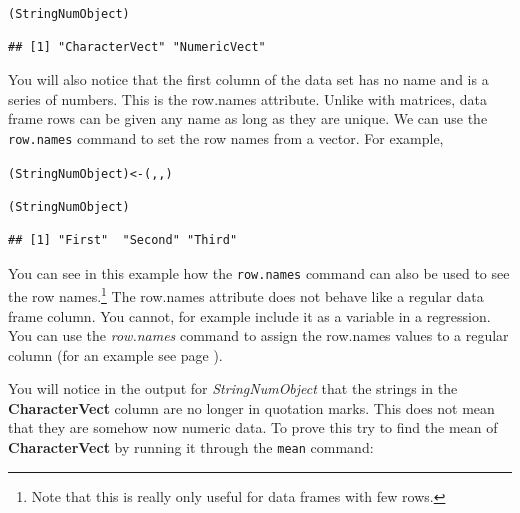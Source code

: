 \documentclass[krantz1]{krantz}
\begin{document}
\begin{knitrout}
\color{fgcolor}\begin{kframe}
\begin{alltt}
(StringNumObject)
\end{alltt}
\begin{verbatim}
## [1] "CharacterVect" "NumericVect"
\end{verbatim}
\end{kframe}
\end{knitrout}


You will also notice that the first column of the data set has no name and is a series of numbers. This is the row.names attribute. Unlike with matrices, data frame rows can be given any name as long as they are unique. We can use the \texttt{row.names} command to set the row names from a vector. For example,

\begin{knitrout}
\color{fgcolor}\begin{kframe}
\begin{alltt}
(StringNumObject) <- (, , )

(StringNumObject)
\end{alltt}
\begin{verbatim}
## [1] "First"  "Second" "Third"
\end{verbatim}
\end{kframe}
\end{knitrout}


You can see in this example how the \texttt{row.names} command can also be used to see the row names.\footnote{Note that this is really only useful for data frames with few rows.} The row.names attribute does not behave like a regular data frame column. You cannot, for example include it as a variable in a regression. You can use the \emph{row.names} command to assign the row.names values to a regular column (for an example see page \pageref{RowNamesTidy}). 

You will notice in the output for \emph{StringNumObject} that the strings in the \textbf{CharacterVect} column are no longer in quotation marks. This does not mean that they are somehow now numeric data. To prove this try to find the mean of \textbf{CharacterVect} by running it through the \texttt{mean} command:
\end{document}
